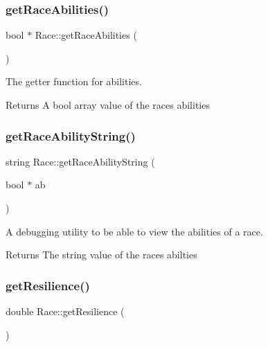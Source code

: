 \subsubsection{\texorpdfstring{getRaceAbilities()}{getRaceAbilities()}}
{\footnotesize\ttfamily bool $\ast$ Race\+::get\+Race\+Abilities (\begin{DoxyParamCaption}{ }\end{DoxyParamCaption})}



The getter function for abilities. 

\begin{DoxyReturn}{Returns}
A bool array value of the race\textquotesingle{}s abilities 
\end{DoxyReturn}
\mbox{\label{class_race_a2624c16d0787ebf05bacab726159c9e7}} 
\subsubsection{\texorpdfstring{getRaceAbilityString()}{getRaceAbilityString()}}
{\footnotesize\ttfamily string Race\+::get\+Race\+Ability\+String (\begin{DoxyParamCaption}\item[{bool $\ast$}]{ab }\end{DoxyParamCaption})}



A debugging utility to be able to view the abilities of a race. 

\begin{DoxyReturn}{Returns}
The string value of the race\textquotesingle{}s abilties 
\end{DoxyReturn}
\mbox{\label{class_race_a28130b5cbfe0756a6d994cd36cd74eb8}} 
\subsubsection{\texorpdfstring{getResilience()}{getResilience()}}
{\footnotesize\ttfamily double Race\+::get\+Resilience (\begin{DoxyParamCaption}{ }\end{DoxyParamCaption})}



